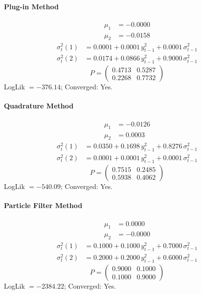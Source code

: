 \documentclass[11pt, a4paper]{article}
\begin{document}
\paragraph{Plug-in Method}
\begin{align}
\mu_{1} &= -0.0000 \\
\mu_{2} &= -0.0158
\end{align}
\begin{align}
\sigma^2_{t}(1) &= 0.0001 + 0.0001\, y_{t-1}^2 + 0.0001\, \sigma^2_{t-1} \\
\sigma^2_{t}(2) &= 0.0174 + 0.0866\, y_{t-1}^2 + 0.9000\, \sigma^2_{t-1}
\end{align}
\begin{equation}
P = \begin{pmatrix} 0.4713 & 0.5287 \\ 0.2268 & 0.7732 \end{pmatrix}
\end{equation}
LogLik $= -376.14$; Converged: Yes.

\paragraph{Quadrature Method}
\begin{align}
\mu_{1} &= -0.0126 \\
\mu_{2} &= 0.0003
\end{align}
\begin{align}
\sigma^2_{t}(1) &= 0.0350 + 0.1698\, y_{t-1}^2 + 0.8276\, \sigma^2_{t-1} \\
\sigma^2_{t}(2) &= 0.0001 + 0.0001\, y_{t-1}^2 + 0.0001\, \sigma^2_{t-1}
\end{align}
\begin{equation}
P = \begin{pmatrix} 0.7515 & 0.2485 \\ 0.5938 & 0.4062 \end{pmatrix}
\end{equation}
LogLik $= -540.09$; Converged: Yes.

\paragraph{Particle Filter Method}
\begin{align}
\mu_{1} &= 0.0000 \\
\mu_{2} &= -0.0000
\end{align}
\begin{align}
\sigma^2_{t}(1) &= 0.1000 + 0.1000\, y_{t-1}^2 + 0.7000\, \sigma^2_{t-1} \\
\sigma^2_{t}(2) &= 0.2000 + 0.2000\, y_{t-1}^2 + 0.6000\, \sigma^2_{t-1}
\end{align}
\begin{equation}
P = \begin{pmatrix} 0.9000 & 0.1000 \\ 0.1000 & 0.9000 \end{pmatrix}
\end{equation}
LogLik $= -2384.22$; Converged: Yes.
\end{document}
